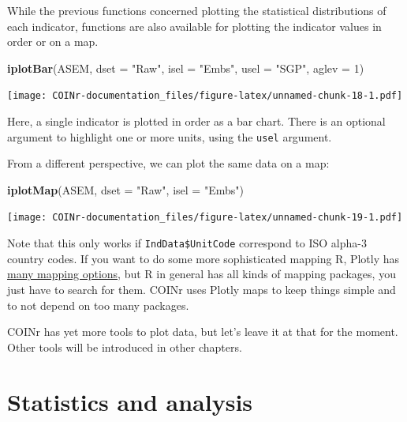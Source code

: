 \documentclass[
]{book}
\newenvironment{Shaded}{\begin{snugshade}}{\end{snugshade}}
\newcommand{\DataTypeTok}[1]{\textcolor[rgb]{0.13,0.29,0.53}{#1}}
\newcommand{\DecValTok}[1]{\textcolor[rgb]{0.00,0.00,0.81}{#1}}
\newcommand{\KeywordTok}[1]{\textcolor[rgb]{0.13,0.29,0.53}{\textbf{#1}}}
\newcommand{\NormalTok}[1]{#1}
\newcommand{\StringTok}[1]{\textcolor[rgb]{0.31,0.60,0.02}{#1}}
\begin{document}
While the previous functions concerned plotting the statistical distributions of each indicator, functions are also available for plotting the indicator values in order or on a map.

\begin{Shaded}
\begin{Highlighting}[]
\KeywordTok{iplotBar}\NormalTok{(ASEM, }\DataTypeTok{dset =} \StringTok{"Raw"}\NormalTok{, }\DataTypeTok{isel =} \StringTok{"Embs"}\NormalTok{, }\DataTypeTok{usel =} \StringTok{"SGP"}\NormalTok{, }\DataTypeTok{aglev =} \DecValTok{1}\NormalTok{)}
\end{Highlighting}
\end{Shaded}

\texttt{[image: COINr-documentation\_files/figure-latex/unnamed-chunk-18-1.pdf]}

Here, a single indicator is plotted in order as a bar chart. There is an optional argument to highlight one or more units, using the \texttt{usel} argument.

From a different perspective, we can plot the same data on a map:

\begin{Shaded}
\begin{Highlighting}[]
\KeywordTok{iplotMap}\NormalTok{(ASEM, }\DataTypeTok{dset =} \StringTok{"Raw"}\NormalTok{, }\DataTypeTok{isel =} \StringTok{"Embs"}\NormalTok{)}
\end{Highlighting}
\end{Shaded}

\texttt{[image: COINr-documentation\_files/figure-latex/unnamed-chunk-19-1.pdf]}

Note that this only works if \texttt{IndData\$UnitCode} correspond to ISO alpha-3 country codes. If you want to do some more sophisticated mapping R, Plotly has \href{https://plotly.com/r/maps/}{many mapping options}, but R in general has all kinds of mapping packages, you just have to search for them. COINr uses Plotly maps to keep things simple and to not depend on too many packages.

COINr has yet more tools to plot data, but let's leave it at that for the moment. Other tools will be introduced in other chapters.

\hypertarget{statistics-and-analysis}{%
\section{Statistics and analysis}\label{statistics-and-analysis}}
\end{document}

